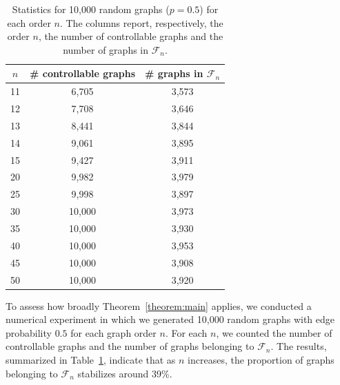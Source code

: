 \documentclass[12pt]{article}
\theoremstyle{plain}
\theoremstyle{definition}
\begin{document}
\begin{table}[htbp]
\centering
\begin{tabular}{c c c}
\hline
$n$ & \# controllable graphs & \# graphs in $\mathcal{F}_n$ \\
\hline
11 & 6,705 & 3,573 \\
12 & 7,708 & 3,646 \\
13 & 8,441 & 3,844 \\
14 & 9,061 & 3,895 \\
15 & 9,427 & 3,911 \\
20 & 9,982 & 3,979 \\
25 & 9,998 & 3,897 \\
30 & 10,000 & 3,973 \\
35 & 10,000 & 3,930 \\
40 & 10,000 & 3,953 \\
45 & 10,000 & 3,908 \\
50 & 10,000 & 3,920 \\
\hline
\end{tabular}

\caption{Statistics for 10,000 random graphs ($p=0.5$) for each order $n$. The columns report, respectively, the order $n$, the number of controllable graphs and the number of graphs in $\mathcal{F}_n$.}
\label{tab:snf-summary}
\end{table}

To assess how broadly Theorem~\ref{theorem:main} applies, we conducted a numerical experiment in which we generated 10,000 random graphs with edge probability $0.5$ for each graph order $n$. For each $n$, we counted the number of controllable graphs and the number of graphs belonging to $\mathcal{F}_n$. The results, summarized in Table~\ref{tab:snf-summary}, indicate that as $n$ increases, the proportion of graphs belonging to $\mathcal{F}_n$ stabilizes around 39\%.


\end{document}

